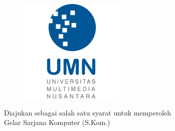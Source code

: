 \onehalfspacing
    \begin{center}    
    

        \begin{minipage}{\textwidth}
            \centering
            \bo{\Judul} 
        \end{minipage}
        

        
        \vspace*{0.5cm}
        \begin{figure}
            \begin{center}
                \includegraphics[width=5cm]{assets/pics/logo_UMN_clean.png}
            \end{center}
        \end{figure}    
        \MakeUppercase{ \bo{\Type} }
        \vspace*{1cm}
               
        
        Diajukan sebagai salah satu syarat untuk memperoleh\\
        Gelar Sarjana Komputer (S.Kom.) \\[1cm]
        \MakeUppercase{ \bo{\penulis}} \\
        \bo{\nim} \\

        \vfill

    \end{center}

\newpage
